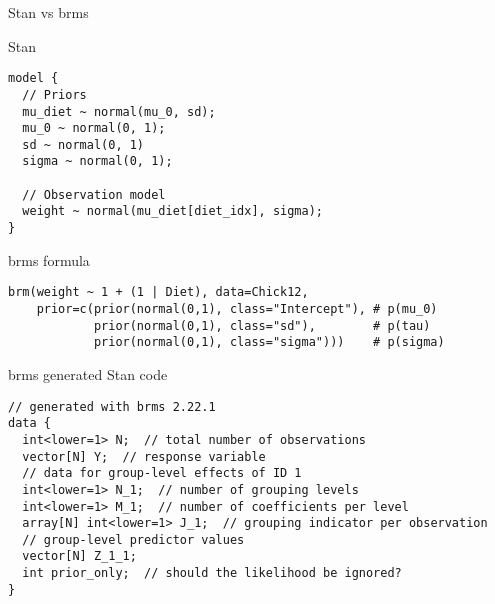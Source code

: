 \documentclass[finnish,english,t]{beamer}
\begin{document}
\begin{frame}[fragile]{Stan vs brms}

  \vspace{-0.5\baselineskip}

  Stan
  
\vspace{-0.5\baselineskip}
{\small
\begin{verbatim}
model {
  // Priors
  mu_diet ~ normal(mu_0, sd);
  mu_0 ~ normal(0, 1);
  sd ~ normal(0, 1)
  sigma ~ normal(0, 1);
  
  // Observation model
  weight ~ normal(mu_diet[diet_idx], sigma);
}
\end{verbatim}

\vspace{-\baselineskip}
{\color{lightgray}\hrulefill}

  brms formula
  \vspace{-0.5\baselineskip}
\begin{verbatim}
brm(weight ~ 1 + (1 | Diet), data=Chick12,
    prior=c(prior(normal(0,1), class="Intercept"), # p(mu_0)
            prior(normal(0,1), class="sd"),        # p(tau)
            prior(normal(0,1), class="sigma")))    # p(sigma)
\end{verbatim}
}

\end{frame}

\begin{frame}[fragile]{brms generated Stan code}

  \vspace{-\baselineskip}
\begin{verbatim}
// generated with brms 2.22.1
data {
  int<lower=1> N;  // total number of observations
  vector[N] Y;  // response variable
  // data for group-level effects of ID 1
  int<lower=1> N_1;  // number of grouping levels
  int<lower=1> M_1;  // number of coefficients per level
  array[N] int<lower=1> J_1;  // grouping indicator per observation
  // group-level predictor values
  vector[N] Z_1_1;
  int prior_only;  // should the likelihood be ignored?
}
\end{verbatim}
  
\end{frame}
\end{document}
